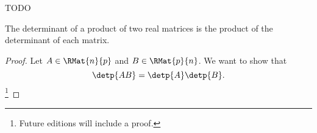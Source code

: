 

TODO


\begin{prop}

The determinant of a product of two real matrices is the product of the determinant of each matrix.
\begin{proof}

Let $A \in \RMat{n}{p}$ and $B \in \RMat{p}{n}$.  We want to show that
  \[\detp{AB} = \detp{A}\detp{B}.\]\footnote{Future editions will include a proof.}

\end{proof}

\end{prop}

\blankpage

